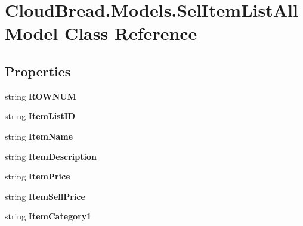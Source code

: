 \hypertarget{a00093}{}\section{Cloud\+Bread.\+Models.\+Sel\+Item\+List\+All\+Model Class Reference}
\label{a00093}
\subsection*{Properties}
\begin{DoxyCompactItemize}
\item 
string {\bfseries R\+O\+W\+N\+UM}\hypertarget{a00093_a8ffa368d845015e056d5dbf1afceabe1}{}\label{a00093_a8ffa368d845015e056d5dbf1afceabe1}

\item 
string {\bfseries Item\+List\+ID}\hypertarget{a00093_a3f726cf03f37251dee2d3315f3206e5d}{}\label{a00093_a3f726cf03f37251dee2d3315f3206e5d}

\item 
string {\bfseries Item\+Name}\hypertarget{a00093_a2c6ae509d1412994646a85f5c854d518}{}\label{a00093_a2c6ae509d1412994646a85f5c854d518}

\item 
string {\bfseries Item\+Description}\hypertarget{a00093_aa95c3815d64954a801c511d76b33f40e}{}\label{a00093_aa95c3815d64954a801c511d76b33f40e}

\item 
string {\bfseries Item\+Price}\hypertarget{a00093_af1f84607f3fc7a2ae3fc67d398257ba9}{}\label{a00093_af1f84607f3fc7a2ae3fc67d398257ba9}

\item 
string {\bfseries Item\+Sell\+Price}\hypertarget{a00093_a870420c0dce3559cd4ce664270c83780}{}\label{a00093_a870420c0dce3559cd4ce664270c83780}

\item 
string {\bfseries Item\+Category1}\hypertarget{a00093_a200d8b80c6849d61d3aaa46306fbe786}{}\label{a00093_a200d8b80c6849d61d3aaa46306fbe786}


\end{DoxyCompactItemize}
